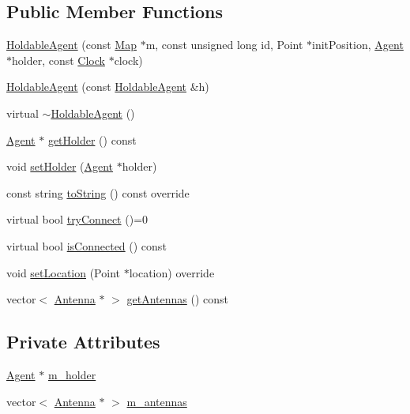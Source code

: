 \subsection*{Public Member Functions}
\begin{DoxyCompactItemize}
\item 
\hyperlink{class_holdable_agent_a04f50f7e7cd8efa7666657de6d5ef22c}{Holdable\+Agent} (const \hyperlink{class_map}{Map} $\ast$m, const unsigned long id, Point $\ast$init\+Position, \hyperlink{class_agent}{Agent} $\ast$holder, const \hyperlink{class_clock}{Clock} $\ast$clock)
\item 
\hyperlink{class_holdable_agent_a9b7c1494266c0a807d809461b59ced80}{Holdable\+Agent} (const \hyperlink{class_holdable_agent}{Holdable\+Agent} \&h)
\item 
virtual \hyperlink{class_holdable_agent_a33ef709d65757cd7e5c3f3cdc40e96a4}{$\sim$\+Holdable\+Agent} ()
\item 
\hyperlink{class_agent}{Agent} $\ast$ \hyperlink{class_holdable_agent_a51f29e5aecf9d288935ddae6da4096ed}{get\+Holder} () const
\item 
void \hyperlink{class_holdable_agent_a39b53c9c6cacca716f38fccc520e9f52}{set\+Holder} (\hyperlink{class_agent}{Agent} $\ast$holder)
\item 
const string \hyperlink{class_holdable_agent_a2c581226b8994f24b6b2306ae17dbb52}{to\+String} () const override
\item 
virtual bool \hyperlink{class_holdable_agent_a0789d757d81b43ee016e9362046f6dea}{try\+Connect} ()=0
\item 
virtual bool \hyperlink{class_holdable_agent_a1578388e51fefe7c19cd3b7c93a184eb}{is\+Connected} () const
\item 
void \hyperlink{class_holdable_agent_aec98d2fe325b48d9a84ad3dad44700e0}{set\+Location} (Point $\ast$location) override
\item 
vector$<$ \hyperlink{class_antenna}{Antenna} $\ast$ $>$ \hyperlink{class_holdable_agent_a226459f2721e5b7b3c72de4b0f05ffbb}{get\+Antennas} () const
\end{DoxyCompactItemize}
\subsection*{Private Attributes}
\begin{DoxyCompactItemize}
\item 
\hyperlink{class_agent}{Agent} $\ast$ \hyperlink{class_holdable_agent_ae9c449c1831f933b5b6b6f71e425279b}{m\+\_\+holder}
\item 
vector$<$ \hyperlink{class_antenna}{Antenna} $\ast$ $>$ \hyperlink{class_holdable_agent_a5f104212204e4c6761bed1d61fab100b}{m\+\_\+antennas}
\end{DoxyCompactItemize}


